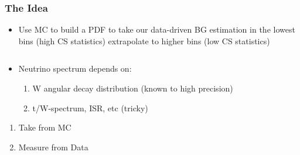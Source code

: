 \documentclass{beamer}
\begin{document}
\begin{frame}
 \frametitle{The Idea}
 \begin{itemize}
  \item Use MC to build a \MHT PDF to take our data-driven BG estimation in the lowest \MHT bins (high CS statistics) extrapolate to higher \MHT bins (low CS statistics)
 \end{itemize}
  \begin{columns}
  \begin{column}{0.45\textwidth}
   \begin{itemize}
    \item Neutrino spectrum depends on:
    \begin{enumerate}
     \item W angular decay distribution (known to high precision)
     \item t/W-\pt spectrum, ISR, etc (tricky)
    \end{enumerate}
    \end{itemize}
    \begin{enumerate}
     \item Take from MC
     \item Measure from Data
    \end{enumerate}
  \end{column}
  \begin{column}{0.55\textwidth}
  \end{column}
 \end{columns}
\end{frame}
\end{document}
